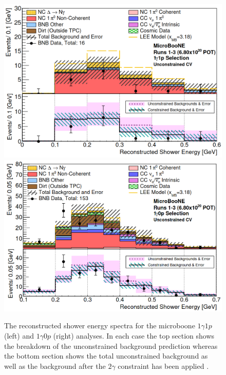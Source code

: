 \begin{figure}[h!]
    \centering
    \includegraphics[width = \smallfigwidth]{figures-chap2/microboone_1gamma_1p.png}
    \includegraphics[width = \smallfigwidth]{figures-chap2/microboone_1gamma0p.png}
    \caption[Reconstructed shower energy spectra for the \gls{microboone} $1\gamma1p$ (left) and $1\gamma0p$ (right) analyses.]{The reconstructed shower energy spectra for the \gls{microboone} $1\gamma1p$ (left) and $1\gamma0p$ (right) analyses. In each case the top section shows the breakdown of the unconstrained background prediction whereas the bottom section shows the total unconstrained background as well as the background after the $2\gamma$ constraint has been applied \cite{Search_for_Neutrino_Induced_Neutral_Current_Delta_Radiative_Decay_in_MicroBooNE_and_a_First_Test_of_the_MiniBooNE_Low_Energy_Excess_under_a_Single_Photon_Hypothesis}.}
    \label{fig:microboone_1gamma}
\end{figure}


